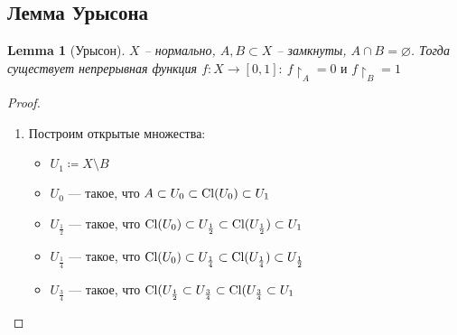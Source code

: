 \documentclass[11pt]{book}
\newcommand{\Cl}{{\mathop{\text{\rm Cl}}}}
\theoremstyle{definition}
\theoremstyle{plain}
\theoremstyle{plain}
\newtheorem*{lm}{Lemma}
\theoremstyle{definition}
\theoremstyle{remark}
\begin{document}
\subsection{Лемма Урысона}
\begin{lm}[Урысон]
    $ X$ -- нормально, $ A, B \subset  X$ -- замкнуты, $ A \cap  B = \varnothing$. Тогда существует непрерывная функция $ f: X \to  [0, 1]: ~ f\!\!\upharpoonright_A = 0 \text{ и } f\!\!\upharpoonright_B = 1$
\end{lm}
\begin{proof}
    $ $
    \begin{enumerate}[label=\roman*. ~]
        \item Построим открытые множества:
	    \begin{itemize}[label=$\blacktriangleright$ ]
		\item $ U_1 \coloneqq X \setminus B$
		\item $ U_0$ --- такое,  что $ A \subset U_0 \subset \Cl (U_0) \subset U_1$
		\item $ U_{\frac{1}{2}}$ --- такое, что $ \Cl(U_0) \subset U_{\frac{1}{2}} \subset \Cl (U_{\frac{1}{2}}) \subset U_1$ 
		\item $ U_{\frac{1}{4}} $ --- такое, что $ \Cl(U_0) \subset U_{\frac{1}{4}}\subset \Cl(U_{\frac{1}{4}}) \subset U_{\frac{1}{2}}$ 
		\item $ U_{\frac{3}{4}}$ --- такое, что $ \Cl(U_{\frac{1}{2}} \subset U_{\frac{3}{4}}\subset \Cl(U_{\frac{3}{4}}\subset U_1$ 


\end{itemize}
\end{enumerate}
\end{proof}
\end{document}
